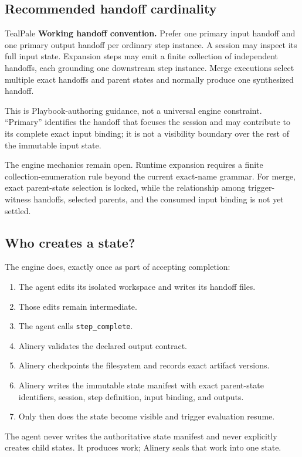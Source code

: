 \documentclass[11pt]{article}
\begin{document}
\clearpage
\thispagestyle{fancy}
\subsection{Recommended handoff cardinality}

\begin{decisionbox}{TealPale}
\textbf{Working handoff convention.} Prefer one primary input handoff and one primary output handoff per ordinary step instance. A session may inspect its full input state. Expansion steps may emit a finite collection of independent handoffs, each grounding one downstream step instance. Merge executions select multiple exact handoffs and parent states and normally produce one synthesized handoff.
\end{decisionbox}

This is Playbook-authoring guidance, not a universal engine constraint. ``Primary'' identifies the handoff that focuses the session and may contribute to its complete exact input binding; it is not a visibility boundary over the rest of the immutable input state.

The engine mechanics remain open. Runtime expansion requires a finite collection-enumeration rule beyond the current exact-name grammar. For merge, exact parent-state selection is locked, while the relationship among trigger-witness handoffs, selected parents, and the consumed input binding is not yet settled.

\Needspace{5.2in}
\subsection{Who creates a state?}

\begin{summarybox}
The engine does, exactly once as part of accepting completion:

\begin{enumerate}[leftmargin=*,itemsep=0.25em,topsep=0.45em]
  \item The agent edits its isolated workspace and writes its handoff files.
  \item Those edits remain intermediate.
  \item The agent calls \texttt{step\_complete}.
  \item Alinery validates the declared output contract.
  \item Alinery checkpoints the filesystem and records exact artifact versions.
  \item Alinery writes the immutable state manifest with exact parent-state identifiers, session, step definition, input binding, and outputs.
  \item Only then does the state become visible and trigger evaluation resume.
\end{enumerate}

The agent never writes the authoritative state manifest and never explicitly creates child states. It produces work; Alinery seals that work into one state.
\end{summarybox}
\end{document}
